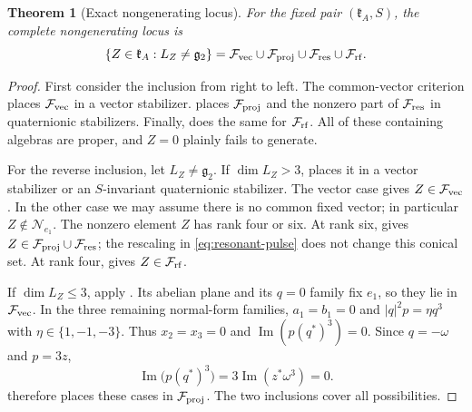 \documentclass[11pt,a4paper]{article}
\newtheorem{theorem}{Theorem}[section]
\begin{document}
\begin{theorem}[Exact nongenerating locus]
\label{thm:complete-failure-set}
For the fixed pair $(\mathfrak k_A,S)$, the complete nongenerating locus is
\begin{equation}
\{Z\in\mathfrak k_A:L_Z\ne\mathfrak g_2\}
 =\mathcal F_{\rm vec}\cup\mathcal F_{\rm proj}\cup\mathcal F_{\rm res}\cup\mathcal F_{\rm rf}.
\label{eq:complete-failure-set}
\end{equation}
\end{theorem}
\begin{proof}
First consider the inclusion from right to left.  The common-vector criterion
 places $\mathcal F_{\rm vec}$ in a vector stabilizer.
 places $\mathcal F_{\rm proj}$ and the nonzero part of
$\mathcal F_{\rm res}$ in quaternionic stabilizers.  Finally,
 does the same for $\mathcal F_{\rm rf}$.
All of these containing algebras are proper, and $Z=0$ plainly fails to generate.

For the reverse inclusion, let $L_Z\ne\mathfrak g_2$.  If
$\dim L_Z>3$,  places it in a vector stabilizer or
an $S$-invariant quaternionic stabilizer.  The vector case gives
$Z\in\mathcal F_{\rm vec}$.  In the other case we may assume there is no common
fixed vector; in particular $Z\notin\mathcal N_{e_1}$.  The nonzero element $Z$
has rank four or six.  At rank six,  gives
$Z\in\mathcal F_{\rm proj}\cup\mathcal F_{\rm res}$; the rescaling in
\eqref{eq:resonant-pulse} does not change this conical set.
At rank four,  gives
$Z\in\mathcal F_{\rm rf}$.

If $\dim L_Z\le3$, apply .
Its abelian plane and its $q=0$ family fix $e_1$, so they lie in
$\mathcal F_{\rm vec}$.  In the three remaining normal-form families,
$a_1=b_1=0$ and $|q|^2p=\eta q^3$ with $\eta\in\{1,-1,-3\}$.
Thus $x_2=x_3=0$ and $\operatorname{Im}(p(q^\ast)^3)=0$.
Since $q=-\omega$ and $p=3z$,
\[
\operatorname{Im}\bigl(p(q^\ast)^3\bigr)
 =3\operatorname{Im}(z^\ast\omega^3)=0.
\]
 therefore places these cases in $\mathcal F_{\rm proj}$.
The two inclusions cover all possibilities.
\end{proof}
\end{document}

